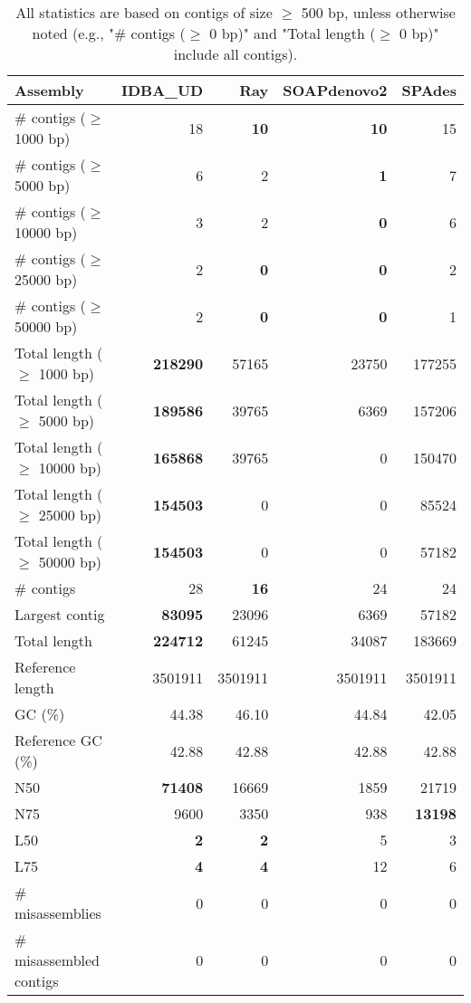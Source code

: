 \documentclass[12pt,a4paper]{article}
\begin{document}
\begin{table}[ht]
\begin{center}
\caption{All statistics are based on contigs of size $\geq$ 500 bp, unless otherwise noted (e.g., "\# contigs ($\geq$ 0 bp)" and "Total length ($\geq$ 0 bp)" include all contigs).}
\begin{tabular}{|l*{4}{|r}|}
\hline
Assembly & IDBA\_UD & Ray & SOAPdenovo2 & SPAdes \\ \hline
\# contigs ($\geq$ 1000 bp) & 18 & {\bf 10} & {\bf 10} & 15 \\ \hline
\# contigs ($\geq$ 5000 bp) & 6 & 2 & {\bf 1} & 7 \\ \hline
\# contigs ($\geq$ 10000 bp) & 3 & 2 & {\bf 0} & 6 \\ \hline
\# contigs ($\geq$ 25000 bp) & 2 & {\bf 0} & {\bf 0} & 2 \\ \hline
\# contigs ($\geq$ 50000 bp) & 2 & {\bf 0} & {\bf 0} & 1 \\ \hline
Total length ($\geq$ 1000 bp) & {\bf 218290} & 57165 & 23750 & 177255 \\ \hline
Total length ($\geq$ 5000 bp) & {\bf 189586} & 39765 & 6369 & 157206 \\ \hline
Total length ($\geq$ 10000 bp) & {\bf 165868} & 39765 & 0 & 150470 \\ \hline
Total length ($\geq$ 25000 bp) & {\bf 154503} & 0 & 0 & 85524 \\ \hline
Total length ($\geq$ 50000 bp) & {\bf 154503} & 0 & 0 & 57182 \\ \hline
\# contigs & 28 & {\bf 16} & 24 & 24 \\ \hline
Largest contig & {\bf 83095} & 23096 & 6369 & 57182 \\ \hline
Total length & {\bf 224712} & 61245 & 34087 & 183669 \\ \hline
Reference length & 3501911 & 3501911 & 3501911 & 3501911 \\ \hline
GC (\%) & 44.38 & 46.10 & 44.84 & 42.05 \\ \hline
Reference GC (\%) & 42.88 & 42.88 & 42.88 & 42.88 \\ \hline
N50 & {\bf 71408} & 16669 & 1859 & 21719 \\ \hline
N75 & 9600 & 3350 & 938 & {\bf 13198} \\ \hline
L50 & {\bf 2} & {\bf 2} & 5 & 3 \\ \hline
L75 & {\bf 4} & {\bf 4} & 12 & 6 \\ \hline
\# misassemblies & 0 & 0 & 0 & 0 \\ \hline
\# misassembled contigs & 0 & 0 & 0 & 0 \\ \hline

\end{tabular}
\end{center}
\end{table}
\end{document}
